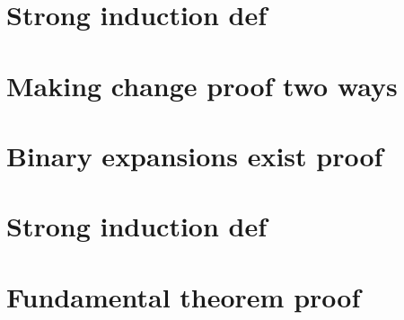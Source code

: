 
\section*{Strong induction def}

\vfill
\section*{Making change proof two ways}

\vfill
\section*{Binary expansions exist proof}

\vfill
\section*{Strong induction def}

\vfill
\section*{Fundamental theorem proof}

\vfill
